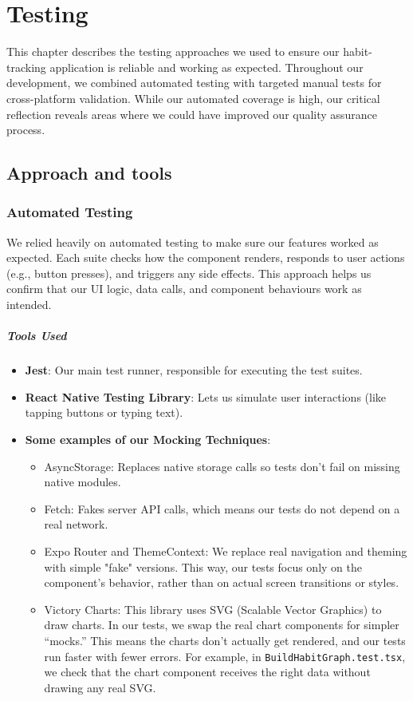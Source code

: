 \chapter{Testing}
\label{chap:testing}

This chapter describes the testing approaches we used to ensure our habit-tracking application is reliable and working as expected. Throughout our development, we combined automated testing with targeted manual tests for cross-platform validation. While our automated coverage is high, our critical reflection reveals areas where we could have improved our quality assurance process.

\section{Approach and tools} \label{sect:testing:approach}

\subsection{Automated Testing}

We relied heavily on automated testing to make sure our features worked as expected. Each suite checks how the component renders, responds to user actions (e.g., button presses), and triggers any side effects. This approach helps us confirm that our UI logic, data calls, and component behaviours work as intended.

\paragraph{Tools Used} \begin{itemize} \item \textbf{Jest}: Our main test runner, responsible for executing the test suites. \item \textbf{React Native Testing Library}: Lets us simulate user interactions (like tapping buttons or typing text). \item \textbf{Some examples of our Mocking Techniques}: \begin{itemize} \item{AsyncStorage}: Replaces native storage calls so tests don’t fail on missing native modules. \item{Fetch}: Fakes server API calls, which means our tests do not depend on a real network. \item {Expo Router and ThemeContext:}
We replace real navigation and theming with simple "fake" versions. This way, our tests focus only on the component’s behavior, rather than on actual screen transitions or styles. \item {Victory Charts}: This library uses SVG (Scalable Vector Graphics) to draw charts. In our tests, we swap the real chart components for simpler “mocks.” This means the charts don’t actually get rendered, and our tests run faster with fewer errors. For example, in \texttt{BuildHabitGraph.test.tsx}, we check that the chart component receives the right data without drawing any real SVG. \end{itemize} \end{itemize}



